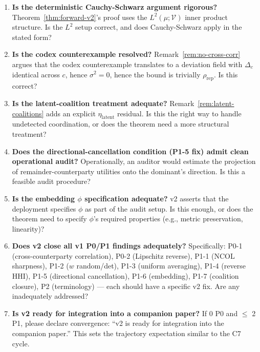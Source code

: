 \documentclass{article}
\begin{document}
\begin{enumerate}
\item \textbf{Is the deterministic Cauchy-Schwarz argument
  rigorous?}  Theorem~\ref{thm:forward-v2}'s proof uses the
  $L^2(\mu; \mathcal{V})$ inner product structure.  Is the $L^2$
  setup correct, and does Cauchy-Schwarz apply in the stated form?

\item \textbf{Is the codex counterexample resolved?}
  Remark~\ref{rem:no-cross-corr} argues that the codex
  counterexample translates to a deviation field with
  $\Delta_c$ identical across $c$, hence $\sigma^2 = 0$, hence
  the bound is trivially $\rho_\mathrm{rep}$.  Is this correct?

\item \textbf{Is the latent-coalition treatment adequate?}
  Remark~\ref{rem:latent-coalitions} adds an explicit
  $\eta_\mathrm{latent}$ residual.  Is this the right way to
  handle undetected coordination, or does the theorem need a
  more structural treatment?

\item \textbf{Does the directional-cancellation condition (P1-5
  fix) admit clean operational audit?}  Operationally, an
  auditor would estimate the projection of remainder-counterparty
  utilities onto the dominant's direction.  Is this a feasible
  audit procedure?

\item \textbf{Is the embedding $\phi$ specification adequate?}
  v2 asserts that the deployment specifies $\phi$ as part of the
  audit setup.  Is this enough, or does the theorem need to
  specify $\phi$'s required properties (e.g., metric preservation,
  linearity)?

\item \textbf{Does v2 close all v1 P0/P1 findings adequately?}
  Specifically: P0-1 (cross-counterparty correlation), P0-2
  (Lipschitz reverse), P1-1 (NCOL sharpness), P1-2 ($w$
  random/det), P1-3 (uniform averaging), P1-4 (reverse HHI),
  P1-5 (directional cancellation), P1-6 (embedding), P1-7
  (coalition closure), P2 (terminology) --- each should have a
  specific v2 fix.  Are any inadequately addressed?

\item \textbf{Is v2 ready for integration into a companion paper?}
  If 0 P0 and $\leq$ 2 P1, please declare convergence: ``v2 is
  ready for integration into the companion paper.''  This sets
  the trajectory expectation similar to the C7 cycle.
\end{enumerate}
\end{document}
